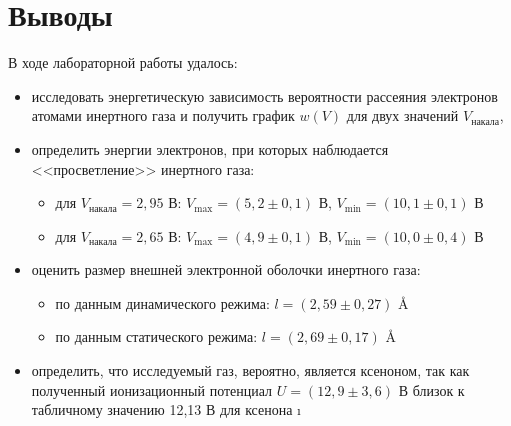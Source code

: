 \documentclass[a4paper,12pt]{extarticle}
\begin{document}
\begin{minipage}{1\textwidth}
\end{minipage}

\section*{Выводы}
В ходе лабораторной работы удалось:
\begin{itemize}
\item исследовать энергетическую зависимость вероятности рассеяния электронов атомами инертного газа и получить график $w(V)$ для двух значений $V_{\text{накала}}$,
\item определить энергии электронов, при которых наблюдается <<просветление>> инертного газа:
\begin{itemize}
\item для $V_{\text{накала}} = 2,95$ В: $V_{\text{max}} = (5,2 \pm 0,1)$ В, $V_{\text{min}} = (10,1 \pm 0,1)$ В
\item для $V_{\text{накала}} = 2,65$ В: $V_{\text{max}} = (4,9 \pm 0,1)$ В, $V_{\text{min}} = (10,0 \pm 0,4)$ В
\end{itemize}
\item оценить размер внешней электронной оболочки инертного газа:
\begin{itemize}
\item по данным динамического режима: $l = (2,59 \pm 0,27)$ \AA
\item по данным статического режима: $l = (2,69 \pm 0,17)$ \AA
\end{itemize}
\item определить, что исследуемый газ, вероятно, является ксеноном, так как полученный ионизационный потенциал $U = (12,9 \pm 3,6)$ В близок к табличному значению 12,13 В для ксенона
\i
\end{itemize}
\end{document}
